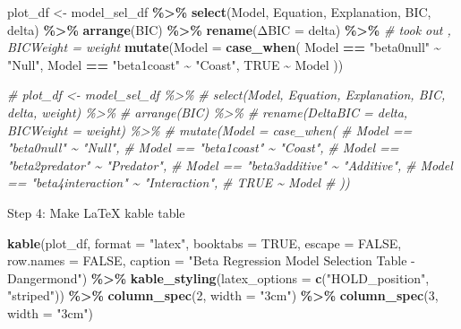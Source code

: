\documentclass[
]{article}
\newenvironment{Shaded}{\begin{snugshade}}{\end{snugshade}}
\newcommand{\AttributeTok}[1]{\textcolor[rgb]{0.13,0.29,0.53}{#1}}
\newcommand{\CommentTok}[1]{\textcolor[rgb]{0.56,0.35,0.01}{\textit{#1}}}
\newcommand{\ConstantTok}[1]{\textcolor[rgb]{0.56,0.35,0.01}{#1}}
\newcommand{\DecValTok}[1]{\textcolor[rgb]{0.00,0.00,0.81}{#1}}
\newcommand{\FunctionTok}[1]{\textcolor[rgb]{0.13,0.29,0.53}{\textbf{#1}}}
\newcommand{\NormalTok}[1]{#1}
\newcommand{\OtherTok}[1]{\textcolor[rgb]{0.56,0.35,0.01}{#1}}
\newcommand{\SpecialCharTok}[1]{\textcolor[rgb]{0.81,0.36,0.00}{\textbf{#1}}}
\newcommand{\StringTok}[1]{\textcolor[rgb]{0.31,0.60,0.02}{#1}}
\begin{document}
\begin{Shaded}
\begin{Highlighting}[]
\NormalTok{plot\_df }\OtherTok{\textless{}{-}}\NormalTok{ model\_sel\_df }\SpecialCharTok{\%\textgreater{}\%}
  \FunctionTok{select}\NormalTok{(Model, Equation, Explanation, BIC, delta) }\SpecialCharTok{\%\textgreater{}\%}
  \FunctionTok{arrange}\NormalTok{(BIC) }\SpecialCharTok{\%\textgreater{}\%}
  \FunctionTok{rename}\NormalTok{(}\StringTok{\textasciigrave{}}\AttributeTok{ΔBIC}\StringTok{\textasciigrave{}} \OtherTok{=}\NormalTok{ delta) }\SpecialCharTok{\%\textgreater{}\%} \CommentTok{\# took out , BICWeight = weight}
  \FunctionTok{mutate}\NormalTok{(}\AttributeTok{Model =} \FunctionTok{case\_when}\NormalTok{(}
\NormalTok{    Model }\SpecialCharTok{==} \StringTok{"beta0null"} \SpecialCharTok{\textasciitilde{}} \StringTok{"Null"}\NormalTok{,}
\NormalTok{    Model }\SpecialCharTok{==} \StringTok{"beta1coast"} \SpecialCharTok{\textasciitilde{}} \StringTok{"Coast"}\NormalTok{,}
    \ConstantTok{TRUE} \SpecialCharTok{\textasciitilde{}}\NormalTok{ Model}
\NormalTok{  ))}

\CommentTok{\# plot\_df \textless{}{-} model\_sel\_df \%\textgreater{}\%}
\CommentTok{\#   select(Model, Equation, Explanation, BIC, delta, weight) \%\textgreater{}\%}
\CommentTok{\#   arrange(BIC) \%\textgreater{}\%}
\CommentTok{\#   rename(DeltaBIC = delta, BICWeight = weight) \%\textgreater{}\%}
\CommentTok{\#   mutate(Model = case\_when(}
\CommentTok{\#     Model == "beta0null" \textasciitilde{} "Null",}
\CommentTok{\#     Model == "beta1coast" \textasciitilde{} "Coast",}
\CommentTok{\#     Model == "beta2predator" \textasciitilde{} "Predator",}
\CommentTok{\#     Model == "beta3additive" \textasciitilde{} "Additive",}
\CommentTok{\#     Model == "beta4interaction" \textasciitilde{} "Interaction",}
\CommentTok{\#     TRUE \textasciitilde{} Model}
\CommentTok{\#   ))}
\end{Highlighting}
\end{Shaded}

Step 4: Make LaTeX kable table

\begin{Shaded}
\begin{Highlighting}[]
\FunctionTok{kable}\NormalTok{(plot\_df, }\AttributeTok{format =} \StringTok{"latex"}\NormalTok{, }\AttributeTok{booktabs =} \ConstantTok{TRUE}\NormalTok{, }\AttributeTok{escape =} \ConstantTok{FALSE}\NormalTok{, }\AttributeTok{row.names =} \ConstantTok{FALSE}\NormalTok{,}
      \AttributeTok{caption =} \StringTok{"Beta Regression Model Selection Table {-} Dangermond"}\NormalTok{) }\SpecialCharTok{\%\textgreater{}\%}
  \FunctionTok{kable\_styling}\NormalTok{(}\AttributeTok{latex\_options =} \FunctionTok{c}\NormalTok{(}\StringTok{"HOLD\_position"}\NormalTok{, }\StringTok{"striped"}\NormalTok{)) }\SpecialCharTok{\%\textgreater{}\%}
  \FunctionTok{column\_spec}\NormalTok{(}\DecValTok{2}\NormalTok{, }\AttributeTok{width =} \StringTok{"3cm"}\NormalTok{) }\SpecialCharTok{\%\textgreater{}\%}
  \FunctionTok{column\_spec}\NormalTok{(}\DecValTok{3}\NormalTok{, }\AttributeTok{width =} \StringTok{"3cm"}\NormalTok{)}
\end{Highlighting}
\end{Shaded}
\end{document}
